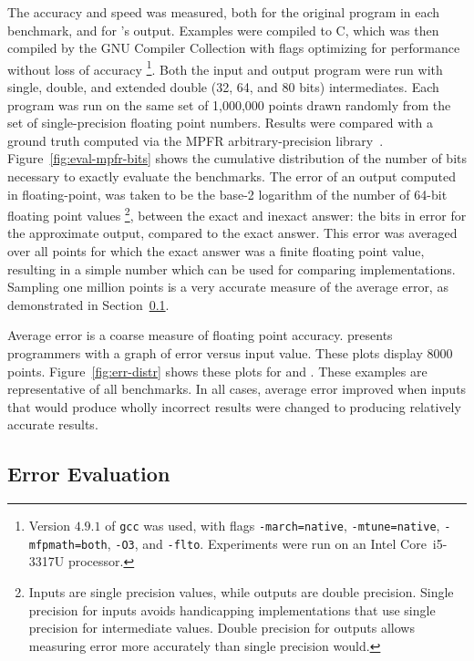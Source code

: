 \documentclass[paper.tex]{subfiles}
\begin{document}
The accuracy and speed was measured, both for the original program in
each benchmark, and for \casio's output.  Examples were compiled to C,
which was then compiled by the GNU Compiler Collection with flags
optimizing for performance without loss of accuracy%
\footnote{Version $4.9.1$ of \texttt{gcc} was used, with flags
  \texttt{-march=native}, \texttt{-mtune=native},
  \texttt{-mfpmath=both}, \texttt{-O3}, and \texttt{-flto}.
  Experiments were run on an Intel Core~i5-3317U processor.}.
  Both the input and output
program were run with single, double, and extended double (32, 64, and
80 bits) intermediates.  Each program was run on the same set of
1,000,000 points drawn randomly from the set of single-precision
floating point numbers.  Results were compared with a ground truth
computed via the MPFR arbitrary-precision library~\cite{acm07-mpfr}.
Figure~\ref{fig:eval-mpfr-bits} shows the cumulative distribution of
the number of bits necessary to exactly evaluate the benchmarks.  The
error of an output computed in floating-point, was taken to be the
base-2 logarithm of the number of 64-bit floating point values%
\footnote{Inputs are single precision values, while outputs are double
  precision.  Single precision for inputs avoids handicapping
  implementations that use single precision for intermediate values.
  Double precision for outputs allows measuring error more accurately
  than single precision would.}, between the exact and inexact answer:
the bits in error for the approximate output, compared to the exact
answer.  This error was averaged over all points for which the exact
answer was a finite floating point value, resulting in a simple number
which can be used for comparing implementations.  Sampling one million
points is a very accurate measure of the average error, as
demonstrated in Section~\ref{sec:eval-eval}.

Average error is a coarse measure of floating point accuracy.  \casio
presents programmers with a graph of error versus input value.  These
plots display 8000 points.  Figure~\ref{fig:err-distr} shows these
plots for  and .  These examples are
representative of all benchmarks.  In all cases, average error
improved when inputs that would produce wholly incorrect results were
changed to producing relatively accurate results.

\subsection{Error Evaluation}
\label{sec:eval-eval}
\end{document}
